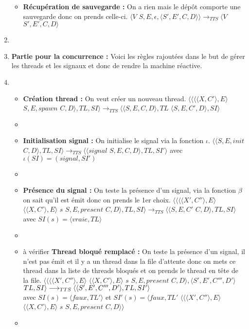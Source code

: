 \documentclass[10pt,a4paper]{article}
\begin{document}
\begin{enumerate}
\begin{itemize}
						\item[] \textbf{Récupération de sauvegarde :}  On a rien mais le dépôt comporte une sauvegarde donc on prends celle-ci.
						\smallbreak  
						$\langle V$ $S,E,\epsilon,\langle S',E',C,D\rangle\rangle
						\longrightarrow_{TTS} 
						\langle V$ $S',E',C,D\rangle$
					\end{itemize}
					\item[]
						
						
						
					\item[] \textbf{Partie pour la concurrence :} Voici les règles rajoutées dans le but de gérer les threads et les signaux et donc de rendre la machine réactive. 
					\item[]
					\begin{itemize}
						\item[]  \textbf{Création thread :} On veut créer un nouveau thread.
						\smallbreak 
						$\langle\langle\langle\langle X,C'\rangle, E\rangle$ $S,E,spawn$ $C,D\rangle,TL,SI\rangle 
						\longrightarrow_{TTS} 
						\langle\langle S,E,C,D\rangle,TL$ $\langle S,E,C',D\rangle,SI\rangle$
						\item[]
							
						\item[] \textbf{Initialisation signal :} On initialise le signal via la fonction $\iota$.
						\smallbreak 
						$\langle\langle S,E,init$ $C,D\rangle,TL,SI\rangle 
						\longrightarrow_{TTS}
						\langle\langle signal$ $S,E,C,D\rangle,TL,SI'\rangle$
						avec $\iota(SI) = (signal,SI')$
						\item[]	
						
						\item[] \textbf{Présence du signal :} On teste la présence d'un signal, via la fonction $\beta$ on sait qu'il est émit donc on prends le 1er choix.
						\smallbreak
						$\langle\langle \langle\langle X',C''\rangle,E\rangle$ $\langle\langle X,C'\rangle,E\rangle$ $s$ $S,E,present$ $C,D\rangle,TL,SI\rangle 
						\longrightarrow_{TTS} 
						\langle\langle S,E,C'$ $C,D\rangle,TL,SI\rangle$ 
						\\avec $SI(s) = \langle vraie,TL\rangle$
						\item[]
							
							
						\item[] à vérifier\textbf{ Thread bloqué remplacé :} On teste la présence d'un signal, il n'est pas émit et il y a un thread dans la file d'attente
						donc on mets ce thread dans la liste de threads bloqués et on prends le thread en tête de la file.
						\smallbreak
						$\langle\langle \langle\langle X',C''\rangle,E\rangle$ $\langle\langle X,C'\rangle,E\rangle$ $s$ $S,E,present$ $C,D\rangle,\langle S',E',C''',D'\rangle$ $TL,SI\rangle 
						\\\longrightarrow_{TTS} 
						\langle\langle S',E',C''',D'\rangle,TL,SI'\rangle$ 
						\\avec $SI(s) = \langle faux,TL'\rangle$
						et $SI'(s) = \langle faux,TL'$ $\langle \langle\langle X',C''\rangle,E\rangle$ $\langle\langle X,C'\rangle,E\rangle$ $s$ $S,E,present$ $C,D\rangle\rangle$
						\item[]	
							

\end{itemize}
\end{enumerate}
\end{document}
